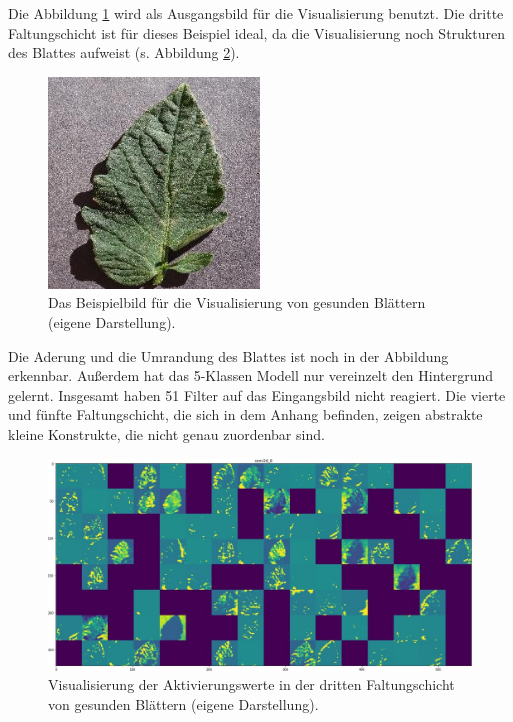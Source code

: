 Die Abbildung \ref{healthy_sample} wird als Ausgangsbild für die Visualisierung benutzt. Die dritte Faltungschicht ist für dieses Beispiel ideal, da die Visualisierung noch Strukturen des Blattes aufweist (s. Abbildung \ref{healthy6}). 
\begin{figure}[h!]
	\centering
	\includegraphics[width=0.5\textwidth]{visualisierungen/healthy/healthy_sample.jpg}
	\caption{Das Beispielbild für die Visualisierung von gesunden Blättern (eigene Darstellung).}
	\label{healthy_sample}
\end{figure}

\newpage
Die Aderung und die Umrandung des Blattes ist noch in der Abbildung erkennbar. Außerdem hat das 5-Klassen Modell nur vereinzelt den Hintergrund gelernt. Insgesamt haben 51 Filter auf das Eingangsbild nicht reagiert. Die vierte und fünfte Faltungschicht, die sich in dem Anhang befinden, zeigen abstrakte kleine Konstrukte, die nicht genau zuordenbar sind.

\begin{figure}[h!]
	\centering
	\includegraphics[width=\textwidth]{visualisierungen/healthy/activation/healthy6.JPG}
	\caption{Visualisierung der Aktivierungswerte in der dritten Faltungschicht von gesunden Blättern (eigene Darstellung).}
	\label{healthy6}
\end{figure}

